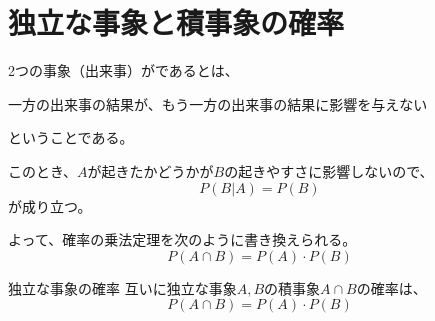 \documentclass[../../../topic_statistics]{subfiles}
\begin{document}
\sectionline
\section{独立な事象と積事象の確率}

2つの事象（出来事）がであるとは、
\begin{emphabox}
  \begin{spacebox}
    \begin{center}
      一方の出来事の結果が、もう一方の出来事の結果に影響を与えない
    \end{center}
  \end{spacebox}
\end{emphabox}
ということである。

\br

このとき、$A$が起きたかどうかが$B$の起きやすさに影響しないので、
\begin{equation*}
  P(B|A) = P(B)
\end{equation*}
が成り立つ。

よって、確率の乗法定理を次のように書き換えられる。
\begin{equation*}
  P(A \cap B) = P(A) \cdot P(B)
\end{equation*}

\begin{theorem}{独立な事象の確率}
  互いに独立な事象$A,B$の積事象$A \cap B$の確率は、
  \begin{equation*}
    P(A \cap B) = P(A) \cdot P(B)
  \end{equation*}
\end{theorem}
\end{document}
